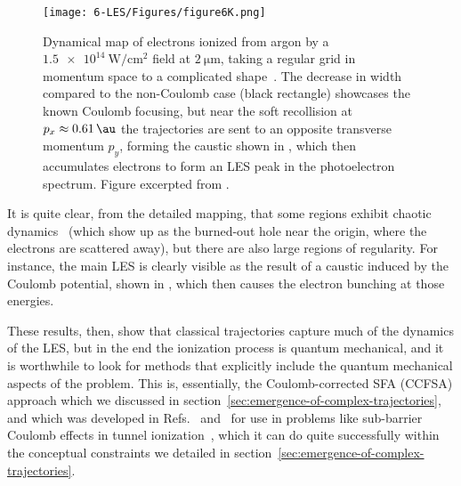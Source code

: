 \begin{figure}[htb]
  \centering
  \subfigure{\label{f6-kelvich-original-figure-a}}
  \subfigure{\label{f6-kelvich-original-figure-b}}
  \texttt{[image: 6-LES/Figures/figure6K.png]}
  \caption[
  High-resolution dynamical map of full classical photoelectron trajectories, showing LES bunching as the result of a caustic in the dynamical map, as calculated by S.A. Kelvich et al.
  ]{
  Dynamical map of electrons ionized from argon by a $\SI{1.5e14}{\watt/\centi\meter^2}$ field at $\SI{2}{\micro\meter}$, taking a regular grid in momentum space to a complicated shape~\cite{kelvich_coulomb-focusing_2015}. The decrease in width compared to the non-Coulomb case (black rectangle) showcases the known Coulomb focusing, but near the soft recollision at $p_x\approx\SI{0.61}{\au}$ the trajectories are sent to an opposite transverse momentum $p_y$, forming the caustic shown in \protect{}, which then accumulates electrons to form an LES peak in the photoelectron spectrum.
  Figure excerpted from .
  }
\label{f6-kelvich-dynamical-map}
\end{figure}

It is quite clear, from the detailed mapping, that some regions exhibit chaotic dynamics~\cite{chaotic_dynamics} (which show up as the burned-out hole near the origin, where the electrons are scattered away), but there are also large regions of regularity. For instance, the main LES is clearly visible as the result of a caustic induced by the Coulomb potential, shown in , which then causes the electron bunching at those energies.





These results, then, show that classical trajectories capture much of the dynamics of the LES, but in the end the ionization process is quantum mechanical, and it is worthwhile to look for methods that explicitly include the quantum mechanical aspects of the problem. This is, essentially, the Coulomb-corrected SFA (CCFSA) approach which we discussed in section~\ref{sec:emergence-of-complex-trajectories}, and which was developed in Refs.~\citealp{CCSFA_initial_short} and~\citealp{ CCSFA_initial_full} for use in problems like sub-barrier Coulomb effects in tunnel ionization~\cite{TCSFA_sub_barrier}, which it can do quite successfully within the conceptual constraints we detailed in section~\ref{sec:emergence-of-complex-trajectories}.

